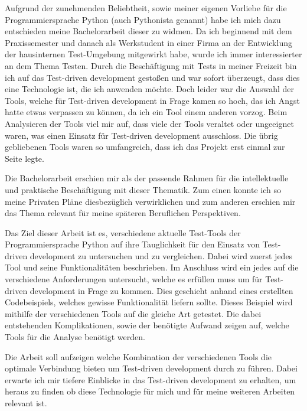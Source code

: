 Aufgrund der zunehmenden Beliebtheit, sowie meiner eigenen Vorliebe für die
Programmiersprache Python (auch \Gls{Pythonista} genannt) habe ich
mich dazu entschieden meine Bachelorarbeit dieser zu widmen. Da ich beginnend
mit dem Praxissemester und danach als Werkstudent in einer Firma an der
Entwicklung der hausinternen Test-Umgebung mitgewirkt habe, wurde ich immer
interessierter an dem Thema Testen. Durch die Beschäftigung mit Tests in meiner
Freizeit bin ich auf das Test-driven development gestoßen und war
sofort überzeugt, dass dies eine Technologie ist, die ich anwenden möchte. Doch
leider war die Auswahl der Tools, welche für Test-driven development in Frage
kamen so hoch, das ich Angst hatte etwas verpassen zu können, da ich ein Tool
einem anderen vorzog. Beim Analysieren der Tools viel mir auf, dass viele der
Tools veraltet oder ungeeignet waren, was einen Einsatz für Test-driven
development ausschloss. Die übrig gebliebenen Tools waren so umfangreich, dass
ich das Projekt erst einmal zur Seite legte.

Die Bachelorarbeit erschien mir als der passende Rahmen für die intellektuelle
und praktische Beschäftigung mit dieser Thematik. Zum einen konnte ich so meine
Privaten Pläne diesbezüglich verwirklichen und zum anderen erschien mir das
Thema relevant für meine späteren Beruflichen Perspektiven.

Das Ziel dieser Arbeit ist es, verschiedene aktuelle Test-Tools der
Programmiersprache Python auf ihre Tauglichkeit für den Einsatz von Test-driven
development zu untersuchen und zu vergleichen. Dabei wird zuerst jedes Tool und
seine Funktionalitäten beschrieben. Im Anschluss wird ein jedes auf die
verschiedene Anforderungen untersucht, welche es erfüllen muss um für
Test-driven development in Frage zu kommen. Dies geschieht anhand eines
erstellten Codebeispiels, welches gewisse Funktionalität liefern sollte.
Dieses Beispiel wird mithilfe der verschiedenen Tools auf die gleiche Art
getestet. Die dabei entstehenden Komplikationen, sowie der benötigte Aufwand
zeigen auf, welche Tools für die Analyse benötigt werden.

Die Arbeit soll aufzeigen welche Kombination der verschiedenen Tools die
optimale Verbindung bieten um Test-driven development durch zu führen. Dabei
erwarte ich mir tiefere Einblicke in das Test-driven development zu erhalten,
um heraus zu finden ob diese Technologie für mich und für meine weiteren
Arbeiten relevant ist.

